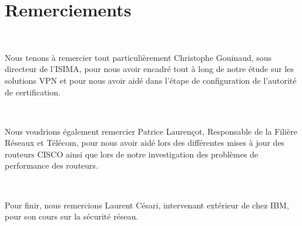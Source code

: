 \section*{Remerciements}

~

Nous tenons à remercier tout particulièrement Christophe Gouinaud, sous directeur de l'ISIMA, pour nous avoir encadré tout à long de notre étude sur les solutions VPN et pour nous avoir aidé dans l'étape de configuration de l'autorité de certification.

~

Nous voudrions également remercier Patrice Laurençot, Responsable de la Filière Réseaux et Télécom, pour nous avoir aidé lors des différentes mises à jour des routeurs CISCO ainsi que lors de notre investigation des problèmes de performance des routeurs.

~

Pour finir, nous remercions Laurent Césari, intervenant extérieur de chez IBM, pour son cours sur la sécurité réseau.

\pagebreak
